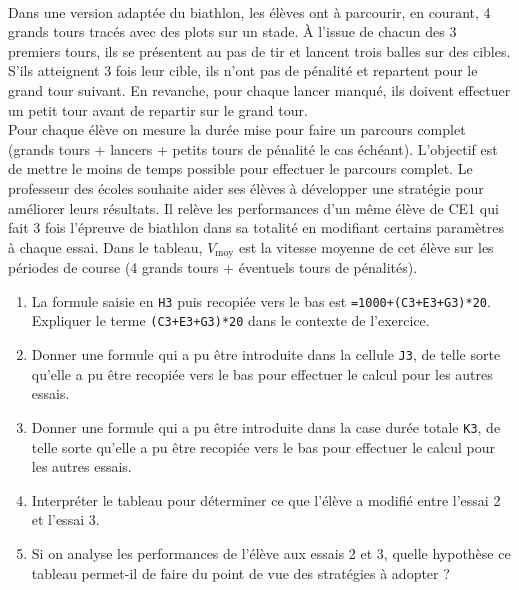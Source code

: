 \begin{activite}
   \ \\ [-16mm]
   \begin{QCM}
      Dans une version adaptée du biathlon, les élèves ont à parcourir, en courant, 4 grands tours tracés avec des plots sur un stade. À l'issue de chacun des 3 premiers tours, ils se présentent au pas de tir et lancent trois balles sur des cibles. S'ils atteignent 3 fois leur cible, ils n'ont pas de pénalité et repartent pour le grand tour suivant. En revanche, pour chaque lancer manqué, ils doivent effectuer un petit tour avant de repartir sur le grand tour. \\
      Pour chaque élève on mesure la durée mise pour faire un parcours complet (grands tours + lancers + petits tours de pénalité le cas échéant). L'objectif est de mettre le moins de temps possible pour effectuer le parcours complet.
      Le professeur des écoles souhaite aider ses élèves à développer une stratégie pour améliorer leurs résultats. Il relève les performances d’un même élève de {\small CE1} qui fait 3 fois l’épreuve de biathlon dans sa totalité en modifiant certains paramètres à chaque essai. Dans le tableau, $V_{\text{moy}}$ est la vitesse moyenne de cet élève sur les périodes de course (4 grands tours + éventuels tours de pénalités).
      \begin{enumerate}
         \item La formule saisie en \texttt{H3} puis recopiée vers le bas est \texttt{=1000+(C3+E3+G3)*20}. \\
            Expliquer le terme \texttt{(C3+E3+G3)*20} dans le contexte de l’exercice.          
         \item Donner une formule qui a pu être introduite dans la cellule \texttt{J3}, de telle sorte qu’elle a pu être recopiée vers le bas pour effectuer le calcul pour les autres essais.               
         \item Donner une formule qui a pu être introduite dans la case \og durée totale \fg{} \texttt{K3}, de telle sorte qu’elle a pu être recopiée vers le bas pour effectuer le calcul pour les autres essais.         
         \item Interpréter le tableau pour déterminer ce que l’élève a modifié entre l’essai 2 et l’essai 3.         
         \item Si on analyse les performances de l’élève aux essais 2 et 3, quelle hypothèse ce tableau permet-il de faire du point de vue des stratégies à adopter ?

\end{enumerate}
\end{QCM}
\end{activite}

